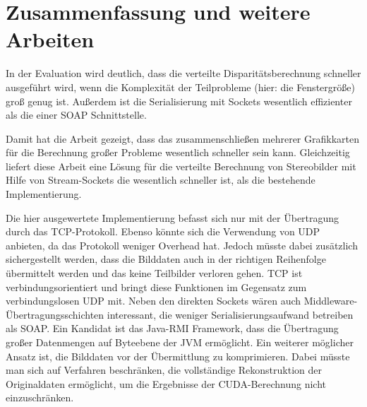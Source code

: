 \documentclass[conference]{IEEEtran}
\begin{document}




\section{Zusammenfassung und weitere Arbeiten}
In der Evaluation wird deutlich, dass die verteilte Disparitätsberechnung schneller ausgeführt wird, wenn die Komplexität der Teilprobleme (hier: die Fenstergröße) groß genug ist. Außerdem ist die Serialisierung mit Sockets wesentlich effizienter als die einer SOAP Schnittstelle.

Damit hat die Arbeit gezeigt, dass das zusammenschließen mehrerer Grafikkarten für die Berechnung großer Probleme wesentlich schneller sein kann. Gleichzeitig liefert diese Arbeit eine Lösung für die verteilte Berechnung von Stereobilder mit Hilfe von Stream-Sockets die wesentlich schneller ist, als die bestehende Implementierung. %


Die hier ausgewertete Implementierung befasst sich nur mit der Übertragung durch das TCP-Protokoll. Ebenso könnte sich die Verwendung von UDP anbieten, da das Protokoll weniger Overhead hat. Jedoch müsste dabei zusätzlich sichergestellt werden, dass die Bilddaten auch in der richtigen Reihenfolge übermittelt werden und das keine Teilbilder verloren gehen. TCP ist verbindungsorientiert und bringt diese Funktionen im Gegensatz zum verbindungslosen UDP mit.
Neben den direkten Sockets wären auch Middleware-Übertragungsschichten interessant, die weniger Serialisierungsaufwand betreiben als SOAP. Ein Kandidat ist das Java-RMI Framework, dass die Übertragung großer Datenmengen auf Byteebene der JVM ermöglicht.
Ein weiterer möglicher Ansatz ist, die Bilddaten vor der Übermittlung zu komprimieren. Dabei müsste man sich auf Verfahren beschränken, die vollständige Rekonstruktion der Originaldaten ermöglicht, um die Ergebnisse der CUDA-Berechnung nicht einzuschränken. 
\end{document}
